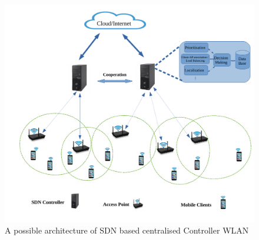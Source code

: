 \documentclass[journal,transmag]{IEEEtran}
\begin{document}
\begin{figure}[t]
\centering
\includegraphics[width=12cm]{Figures/SDN_Controller_WLAN.pdf}
\caption{A possible architecture of SDN based centralised Controller WLAN}
\label{SDN_WLAN}
\end{figure}
 
\end{document}
